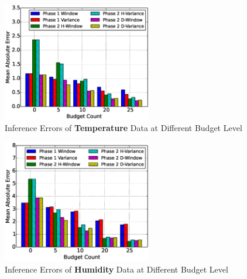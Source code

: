 \documentclass[12pt]{article}  %
\theoremstyle{definition}
\theoremstyle{remark}
\begin{document}
\begin{figure}[h]
\centering
        \includegraphics[width=0.58\textwidth]{../phase2/temperature_err}
        \caption{Inference Errors of \textbf{Temperature} Data at Different Budget Level}
\label{fig:phase1:temperature}
\end{figure}

\begin{figure}[h]
\centering
        \includegraphics[width=0.58\textwidth]{../phase2/humidity_err}
        \caption{Inference Errors of \textbf{Humidity} Data at Different Budget Level}
\label{fig:phase1:humidity}
\end{figure}




%
%
%
\end{document}
